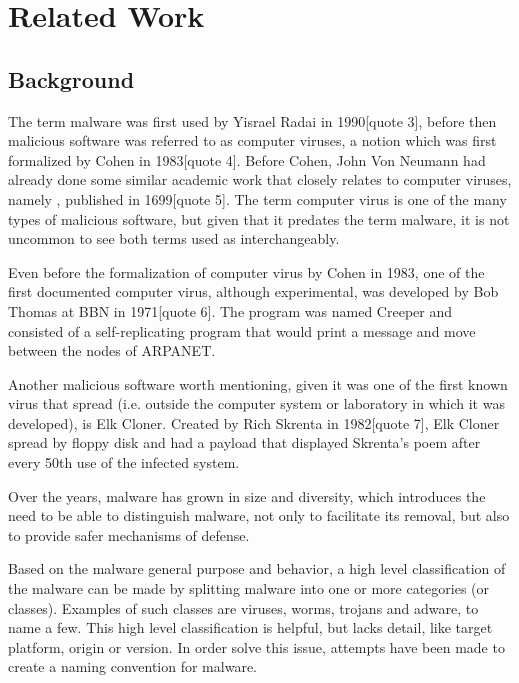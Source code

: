 \documentclass{llncs}
\begin{document}
\clearpage
\section{Related Work}\label{sec:related_work}
\subsection{Background}\label{subsec:background}
The term malware was first used by Yisrael Radai in 1990[quote 3], before then malicious software was referred to as computer viruses, a notion which was first formalized by Cohen in 1983[quote 4]. Before Cohen, John Von Neumann had already done some similar academic work that closely relates to computer viruses, namely , published in 1699[quote 5]. The term computer virus is one of the many types of malicious software, but given that it predates the term malware, it is not uncommon to see both terms used as interchangeably.

Even before the formalization of computer virus by Cohen in 1983, one of the first documented computer virus, although experimental, was developed by Bob Thomas at BBN in 1971[quote 6]. The program was named Creeper and consisted of a self-replicating program that would print a message and move between the nodes of ARPANET.

Another malicious software worth mentioning, given it was one of the first known virus that spread  (i.e. outside the computer system or laboratory in which it was developed), is Elk Cloner. Created by Rich Skrenta in 1982[quote 7], Elk Cloner spread by floppy disk and had a payload that displayed Skrenta's poem after every 50th use of the infected system.

Over the years, malware has grown in size and diversity, which introduces the need to be able to distinguish malware, not only to facilitate its removal, but also to provide safer mechanisms of defense.

Based on the malware general purpose and behavior, a high level classification of the malware can be made by splitting malware into one or more categories (or classes). Examples of such classes are viruses, worms, trojans and adware, to name a few. This high level classification is helpful, but lacks detail, like target platform, origin or version. In order solve this issue, attempts have been made to create a naming convention for malware.
\end{document}
